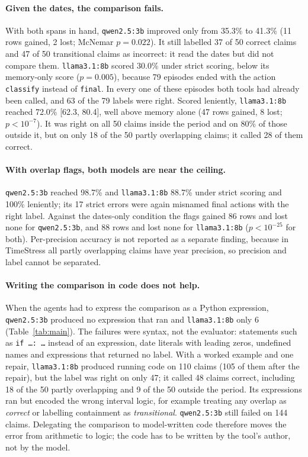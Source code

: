 \documentclass[11pt,a4paper]{article}
\newcommand{\code}[1]{\texttt{#1}}
\begin{document}
\paragraph{Given the dates, the comparison fails.} With both spans in hand, \code{qwen2.5:3b} improved only from
35.3\% to 41.3\% (11 rows gained, 2 lost; McNemar $p=0.022$). It still labelled 37 of 50 correct claims and 47 of 50
transitional claims as incorrect: it read the dates but did not compare them. \code{llama3.1:8b} scored 30.0\% under
strict scoring, below its memory-only score ($p=0.005$), because 79 episodes ended with the action
\code{classify} instead of \code{final}. In every one of these episodes both tools had already been called, and 63 of
the 79 labels were right. Scored leniently, \code{llama3.1:8b} reached 72.0\% [62.3, 80.4], well above memory alone
(47 rows gained, 8 lost; $p<10^{-7}$). It was right on all 50 claims inside the period and on 80\% of those outside it,
but on only 18 of the 50 partly overlapping claims; it called 28 of them correct.

\paragraph{With overlap flags, both models are near the ceiling.} \code{qwen2.5:3b} reached 98.7\% and
\code{llama3.1:8b} 88.7\% under strict scoring and 100\% leniently; its 17 strict errors were again misnamed final
actions with the right label. Against the dates-only condition the flags gained 86 rows and lost none for
\code{qwen2.5:3b}, and 88 rows and lost none for \code{llama3.1:8b} ($p<10^{-25}$ for both). Per-precision accuracy is not reported as a separate finding, because in TimeStress all partly overlapping claims have year precision, so
precision and label cannot be separated.

\paragraph{Writing the comparison in code does not help.} When the agents had to express the comparison as a Python
expression, \code{qwen2.5:3b} produced no expression that ran and \code{llama3.1:8b} only 6 (Table~\ref{tab:main}).
The failures were syntax, not the evaluator: statements such as \code{if \ldots: \ldots} instead of an expression, date
literals with leading zeros, undefined names and expressions that returned no label. With a worked example and one repair,
\code{llama3.1:8b} produced running code on 110 claims (105 of them after the repair), but the label was right on only
47; it called 48 claims correct, including 18 of the 50 partly overlapping and 9 of the 50 outside the period. Its
expressions ran but encoded the wrong interval logic, for example treating any overlap as \emph{correct} or labelling
containment as \emph{transitional}. \code{qwen2.5:3b} still failed on 144 claims.
Delegating the comparison to model-written code therefore moves the error from arithmetic to logic; the code has to be
written by the tool's author, not by the model.
\end{document}
